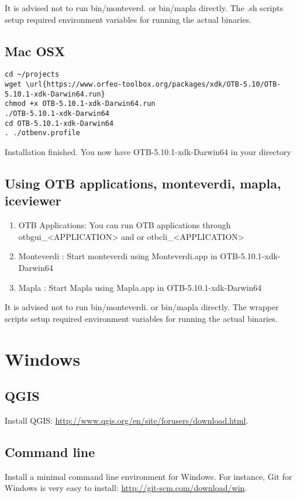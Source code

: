 \documentclass[10pt,a4paper]{article}
\begin{document}
It is advised not to run bin/monteverd. or bin/mapla directly. 
The .sh scripts setup required environment variables for running the actual binaries.

\subsection{Mac OSX}

\begin{verbatim}
cd ~/projects
wget \url{https://www.orfeo-toolbox.org/packages/xdk/OTB-5.10/OTB-5.10.1-xdk-Darwin64.run}
chmod +x OTB-5.10.1-xdk-Darwin64.run
./OTB-5.10.1-xdk-Darwin64
cd OTB-5.10.1-xdk-Darwin64
. ./otbenv.profile
\end{verbatim}


Installation finished. You now have OTB-5.10.1-xdk-Darwin64 in your directory

\subsection{Using OTB applications, monteverdi, mapla, iceviewer}

\begin{enumerate}
\item OTB Applications: You can run OTB applications through otbgui\_<APPLICATION> and or otbcli\_<APPLICATION> 
\item Monteverdi : Start monteverdi using Monteverdi.app in OTB-5.10.1-xdk-Darwin64
\item Mapla : Start Mapla using Mapla.app in OTB-5.10.1-xdk-Darwin64
\end{enumerate}

It is advised not to run bin/monteverdi. or bin/mapla directly. 
The wrapper scripts setup required environment variables for running the actual binaries.


\section{Windows}

\subsection{QGIS}
Install QGIS: \url{http://www.qgis.org/en/site/forusers/download.html}.

\subsection{Command line}
Install a minimal command line environment for Windows. For instance, Git for Windows is very easy to install:
\url{http://git-scm.com/download/win}.
\end{document}
